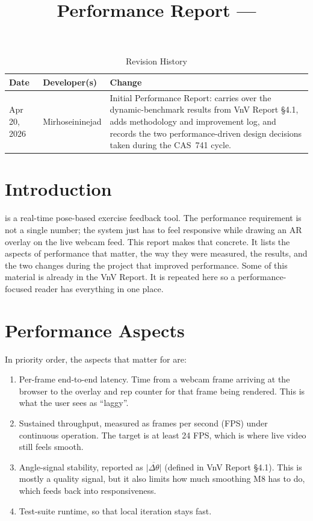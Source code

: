 \documentclass{article}
\title{Performance Report --- \progname}
\author{\authname}
\date{}
\begin{document}
\maketitle

\begin{table}[hp]
\caption{Revision History} \label{TblRevisionHistory}
\begin{tabularx}{\textwidth}{llX}
\toprule
\textbf{Date} & \textbf{Developer(s)} & \textbf{Change}\\
\midrule
Apr 20, 2026 & Mirhoseininejad & Initial Performance Report: carries over the
dynamic-benchmark results from VnV Report \S4.1, adds methodology and
improvement log, and records the two performance-driven design decisions
taken during the CAS~741 cycle.\\
\bottomrule
\end{tabularx}
\end{table}

\newpage

\section{Introduction}

\progname{} is a real-time pose-based exercise feedback tool. The
performance requirement is not a single number; the system just has to
feel responsive while drawing an AR overlay on the live webcam feed.
This report makes that concrete. It lists the aspects of performance
that matter, the way they were measured, the results, and the two
changes during the project that improved performance. Some of this
material is already in the VnV Report. It is repeated here so a
performance-focused reader has everything in one place.

\section{Performance Aspects}

In priority order, the aspects that matter for \progname{} are:

\begin{enumerate}
  \item Per-frame end-to-end latency. Time from a webcam frame
    arriving at the browser to the overlay and rep counter for that
    frame being rendered. This is what the user sees as ``laggy''.
  \item Sustained throughput, measured as frames per second (FPS)
    under continuous operation. The target is at least 24 FPS, which
    is where live video still feels smooth.
  \item Angle-signal stability, reported as
    $\overline{|\Delta\theta|}$ (defined in VnV Report \S4.1). This is
    mostly a quality signal, but it also limits how much smoothing M8
    has to do, which feeds back into responsiveness.
  \item Test-suite runtime, so that local iteration stays fast.
\end{enumerate}
\end{document}
